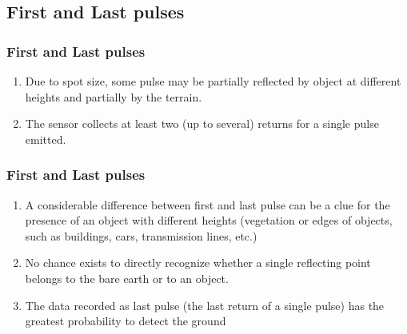 \subsection{First and Last pulses}
\begin{frame}[label=firstlast1]
    \frametitle{First and Last pulses}
    \begin{enumerate}
        \item Due to spot size, some pulse may be partially reflected by object at different heights and partially by the terrain. 
	\item The sensor collects at least two (up to several) returns for a single pulse emitted.
    \end{enumerate}
   \begin{center}
   \end{center}
\end{frame}
\begin{frame}[label=firstlast2]
    \frametitle{First and Last pulses}
    \begin{enumerate}
	\item A considerable difference between first and last pulse can be a clue for the presence of an object with different heights (vegetation or edges of objects, such as buildings, cars, transmission lines, etc.)
	\item No chance exists to directly recognize whether a single reflecting point belongs to the bare earth or to an object.
        \item The data recorded as last pulse (the last return of a single pulse) has the greatest probability to detect the ground
    \end{enumerate}
\end{frame}
